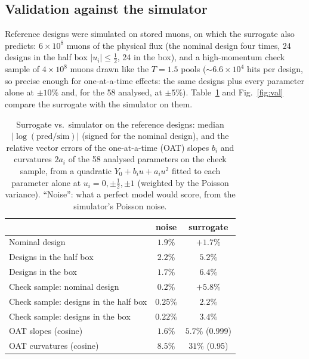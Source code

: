 \documentclass[11pt,a4paper]{article}
\begin{document}
\subsection{Validation against the simulator}
\label{sec:validation}

Reference designs were simulated on stored muons, on which the surrogate also predicts:
$6\times10^8$ muons of the physical flux (the nominal design four times, 24 designs in the half
box $|u_i|\le\tfrac12$, 24 in the box), and a high-momentum check sample of $4\times10^8$ muons
drawn like the $T=1.5$ pools ($\sim6.6\times10^4$ hits per design, so precise enough for
one-at-a-time effects: the same designs plus every parameter alone at $\pm10\%$ and, for the 58
analysed, at $\pm5\%$).
Table~\ref{tab:val} and Fig.~\ref{fig:val} compare the surrogate with the simulator on them.

\begin{table}[t]
\centering
\caption{Surrogate vs.\ simulator on the reference designs: median $|\log(\text{pred}/\text{sim})|$
(signed for the nominal design), and the relative vector errors of the one-at-a-time (OAT) slopes
$b_i$ and curvatures $2a_i$ of the 58 analysed parameters on the check sample, from a quadratic
$Y_0+b_iu+a_iu^2$ fitted to each parameter alone at $u_i=0,\pm\tfrac12,\pm1$ (weighted by the
Poisson variance). ``Noise'': what a perfect model would score, from the simulator's Poisson
noise.}
\label{tab:val}
\begin{tabular}{lcc}
\toprule
 & noise & surrogate \\
\midrule
Nominal design                  & $1.9\%$  & $+1.7\%$ \\
Designs in the half box         & $2.2\%$  & $5.2\%$ \\
Designs in the box              & $1.7\%$  & $6.4\%$ \\
Check sample: nominal design    & $0.2\%$  & $+5.8\%$ \\
Check sample: designs in the half box & $0.25\%$ & $2.2\%$ \\
Check sample: designs in the box & $0.22\%$ & $3.4\%$ \\
OAT slopes (cosine)             & $1.6\%$  & $5.7\%$ (0.999) \\
OAT curvatures (cosine)         & $8.5\%$  & $31\%$ (0.95) \\
\bottomrule
\end{tabular}
\end{table}
\end{document}
